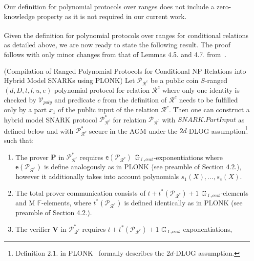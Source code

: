 \noindent Our definition for polynomial protocols over ranges does not include a zero-knowledge property as it is not required in our current work. \\

 \\

\noindent Given the definition for polynomial protocols over ranges for conditional relations as detailed above, we are now ready to state the following result.
The proof follows with only minor changes from that of Lemmas 4.5. and 4.7. from~\cite{plonk}. 

\begin{lemma}(Compilation of Ranged Polynomial Protocols for Conditional NP Relations into Hybrid Model SNARKs using PLONK) 
\label{le:compilation_step_1}
Let $\mathscr{P}_{\mathcal{R}^c}$ be a public coin $S$-ranged $(d, D, t, l, u, e)$-polynomial protocol for relation $\mathcal{R}^c$ where only 
one identity is checked by $\mathcal{V}_{poly}$ and predicate $c$ from the definition of ${\mathcal{R}^c}$ needs to be fulfilled only by a part $x_1$ 
of the public input of the relation ${\mathcal{R}^c}$. Then one can construct a hybrid model SNARK protocol $\mathscr{P}^*_{\mathcal{R}^c}$ for relation 
$\mathscr{P}_{\mathcal{R}^c}$ with $\mathit{SNARK.PartInput}$ as defined below 
and with $\mathscr{P}^*_{\mathcal{R}^c}$ secure in the AGM under the $2d$-DLOG 
assumption\footnote{Definition 2.1. in PLONK~\cite{plonk} formally describes the $2d$-DLOG assumption.} such that:
\begin{enumerate}
\item The prover $\mathbf{P}$ in $\mathscr{P}^*_{\mathcal{R}^c}$ requires $\mathsf{e}(\mathscr{P}_{\mathcal{R}^c})$ $\mathbb{G}_{\mathit{1,out}}$-exponentiations where 
$\mathsf{e}(\mathscr{P}_{\mathcal{R}^c})$ is define analogously as in PLONK (see preamble of Section 4.2.), however it additionally takes into account 
polynomials $s_1(X), \ldots, s_e(X)$. 
\item The total prover communication consists of $t + t^*(\mathscr{P}_{\mathcal{R}^c}) + 1$ $\mathbb{G}_{\mathit{1,out}}$-elements and M $\mathbb{F}$-elements, where 
$t^*(\mathscr{P}_{\mathcal{R}^c})$ is defined identically as in PLONK (see preamble of Section 4.2.).
\item The verifier $\mathbf{V}$ in $\mathscr{P}^*_{\mathcal{R}^c}$ requires $t + t^*(\mathscr{P}_{\mathcal{R}^c})+1$ $\mathbb{G}_{\mathit{1,out}}$-exponentiations, 

\end{enumerate}
\end{lemma}
